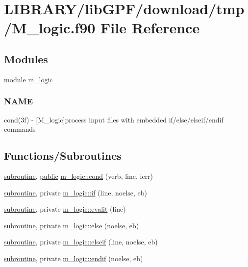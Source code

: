 \hypertarget{M__logic_8f90}{}\section{L\+I\+B\+R\+A\+R\+Y/lib\+G\+P\+F/download/tmp/\+M\+\_\+logic.f90 File Reference}
\label{M__logic_8f90}
\subsection*{Modules}
\begin{DoxyCompactItemize}
\item 
module \hyperlink{namespacem__logic}{m\+\_\+logic}
\begin{DoxyCompactList}\small\item\em \subsubsection*{N\+A\+ME}

cond(3f) -\/ \mbox{[}M\+\_\+logic\mbox{]}process input files with embedded if/else/elseif/endif commands \end{DoxyCompactList}\end{DoxyCompactItemize}
\subsection*{Functions/\+Subroutines}
\begin{DoxyCompactItemize}
\item 
\hyperlink{M__stopwatch_83_8txt_acfbcff50169d691ff02d4a123ed70482}{subroutine}, \hyperlink{M__stopwatch_83_8txt_a2f74811300c361e53b430611a7d1769f}{public} \hyperlink{namespacem__logic_a169fe24f769ed7cd5336409c0722900e}{m\+\_\+logic\+::cond} (verb, line, ierr)
\item 
\hyperlink{M__stopwatch_83_8txt_acfbcff50169d691ff02d4a123ed70482}{subroutine}, private \hyperlink{namespacem__logic_a2229d0129ded7d8a34fce60334bc5938}{m\+\_\+logic\+::if} (line, noelse, eb)
\item 
\hyperlink{M__stopwatch_83_8txt_acfbcff50169d691ff02d4a123ed70482}{subroutine}, private \hyperlink{namespacem__logic_aa03730fb0581290fa8c776b633430584}{m\+\_\+logic\+::evalit} (line)
\item 
\hyperlink{M__stopwatch_83_8txt_acfbcff50169d691ff02d4a123ed70482}{subroutine}, private \hyperlink{namespacem__logic_ac51075acbd12f22ae97edd87352cba67}{m\+\_\+logic\+::else} (noelse, eb)
\item 
\hyperlink{M__stopwatch_83_8txt_acfbcff50169d691ff02d4a123ed70482}{subroutine}, private \hyperlink{namespacem__logic_abb56458f58725800b593e986b23ec2d3}{m\+\_\+logic\+::elseif} (line, noelse, eb)
\item 
\hyperlink{M__stopwatch_83_8txt_acfbcff50169d691ff02d4a123ed70482}{subroutine}, private \hyperlink{namespacem__logic_a60ae51929ab2f5d32f2a8f7e07e6debc}{m\+\_\+logic\+::endif} (noelse, eb)
\end{DoxyCompactItemize}
